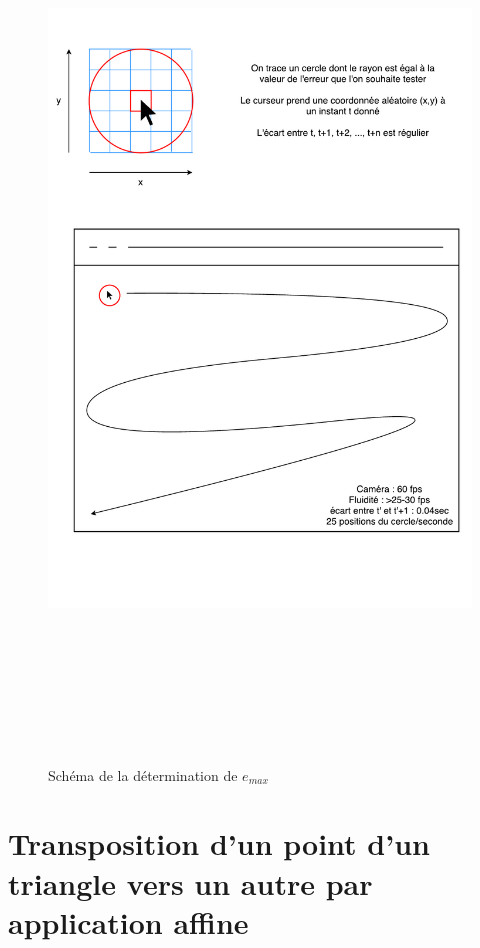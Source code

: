 \documentclass[a4paper, 12pt]{report}
\begin{document}
    \begin{figure}
    \centering\includegraphics[height=24cm]{erreur_max.pdf}
    \caption{Schéma de la détermination de $e_{max}$ }
    \end{figure}
    \newpage
         
	\section{Transposition d'un point d'un triangle vers un autre par application affine}
\end{document}
